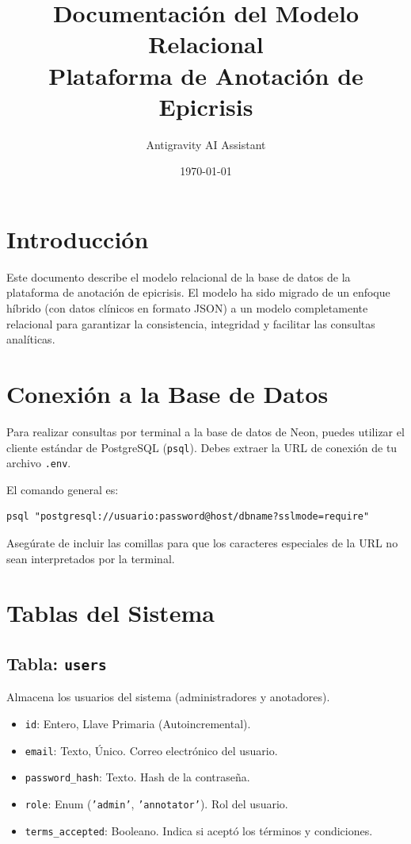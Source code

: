\documentclass{article}
\title{Documentación del Modelo Relacional \\ Plataforma de Anotación de Epicrisis}
\author{Antigravity AI Assistant}
\date{\today}
\begin{document}
\maketitle

\section{Introducción}
Este documento describe el modelo relacional de la base de datos de la plataforma de anotación de epicrisis. El modelo ha sido migrado de un enfoque híbrido (con datos clínicos en formato JSON) a un modelo completamente relacional para garantizar la consistencia, integridad y facilitar las consultas analíticas.

\section{Conexión a la Base de Datos}
Para realizar consultas por terminal a la base de datos de Neon, puedes utilizar el cliente estándar de PostgreSQL (\texttt{psql}). Debes extraer la URL de conexión de tu archivo \texttt{.env}.

El comando general es:
\begin{verbatim}
psql "postgresql://usuario:password@host/dbname?sslmode=require"
\end{verbatim}

Asegúrate de incluir las comillas para que los caracteres especiales de la URL no sean interpretados por la terminal.

\section{Tablas del Sistema}

\subsection{Tabla: \texttt{users}}
Almacena los usuarios del sistema (administradores y anotadores).

\begin{itemize}
    \item \texttt{id}: Entero, Llave Primaria (Autoincremental).
    \item \texttt{email}: Texto, Único. Correo electrónico del usuario.
    \item \texttt{password\_hash}: Texto. Hash de la contraseña.
    \item \texttt{role}: Enum (\texttt{'admin'}, \texttt{'annotator'}). Rol del usuario.
    \item \texttt{terms\_accepted}: Booleano. Indica si aceptó los términos y condiciones.
\end{itemize}
\end{document}
